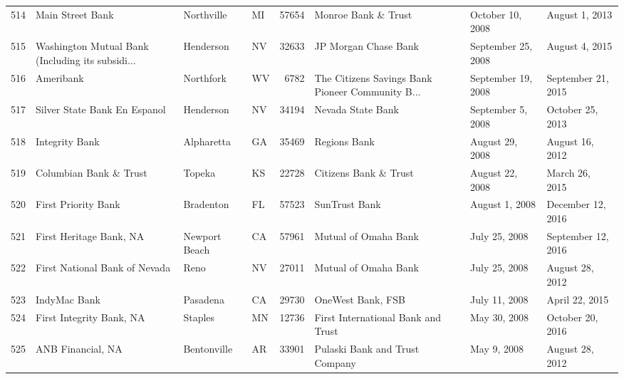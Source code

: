 \begin{tabular}{llllrlll}
514 &                                   Main Street Bank &          Northville &  MI &  57654 &                                Monroe Bank \& Trust &    October 10, 2008 &      August 1, 2013 \\
515 &  Washington Mutual Bank  (Including its subsidi... &           Henderson &  NV &  32633 &                               JP Morgan Chase Bank &  September 25, 2008 &      August 4, 2015 \\
516 &                                          Ameribank &           Northfork &  WV &   6782 &  The Citizens Savings Bank  Pioneer Community B... &  September 19, 2008 &  September 21, 2015 \\
517 &                      Silver State Bank  En Espanol &           Henderson &  NV &  34194 &                                  Nevada State Bank &   September 5, 2008 &    October 25, 2013 \\
518 &                                     Integrity Bank &          Alpharetta &  GA &  35469 &                                       Regions Bank &     August 29, 2008 &     August 16, 2012 \\
519 &                             Columbian Bank \& Trust &              Topeka &  KS &  22728 &                              Citizens Bank \& Trust &     August 22, 2008 &      March 26, 2015 \\
520 &                                First Priority Bank &           Bradenton &  FL &  57523 &                                      SunTrust Bank &      August 1, 2008 &   December 12, 2016 \\
521 &                            First Heritage Bank, NA &       Newport Beach &  CA &  57961 &                               Mutual of Omaha Bank &       July 25, 2008 &  September 12, 2016 \\
522 &                      First National Bank of Nevada &                Reno &  NV &  27011 &                               Mutual of Omaha Bank &       July 25, 2008 &     August 28, 2012 \\
523 &                                       IndyMac Bank &            Pasadena &  CA &  29730 &                                  OneWest Bank, FSB &       July 11, 2008 &      April 22, 2015 \\
524 &                           First Integrity Bank, NA &             Staples &  MN &  12736 &                 First International Bank and Trust &        May 30, 2008 &    October 20, 2016 \\
525 &                                  ANB Financial, NA &         Bentonville &  AR &  33901 &                     Pulaski Bank and Trust Company &         May 9, 2008 &     August 28, 2012 \\

\end{tabular}
